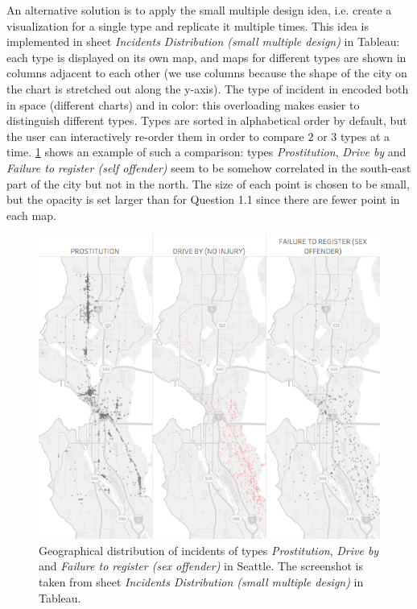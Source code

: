 An alternative solution is to apply the small multiple design idea, i.e. create a visualization for a single type and replicate it multiple times.
This idea is implemented in sheet \textit{Incidents Distribution (small multiple design)} in Tableau:
each type is displayed on its own map, and maps for different types are shown in columns adjacent to each other (we use columns because the shape of the city on the chart is stretched out along the y-axis).
The type of incident in encoded both in space (different charts) and in color:
this overloading makes easier to distinguish different types.
Types are sorted in alphabetical order by default, but the user can interactively re-order them in order to compare $2$ or $3$ types at a time.
\cref{fig:1_2_geographical_distribution_comparison} shows an example of such a comparison:
types \textit{Prostitution}, \textit{Drive by} and \textit{Failure to register (self offender)} seem to be somehow correlated in the south-east part of the city but not in the north.
The size of each point is chosen to be small, but the opacity is set larger than for Question 1.1 since there are fewer point in each map.

\begin{figure}[H]
	\centering
	\includegraphics[width=.75\columnwidth]{figures/1_2_geographical_distribution_comparison}
	\caption{Geographical distribution of incidents of types \textit{Prostitution}, \textit{Drive by} and \textit{Failure to register (sex offender)} in Seattle. The screenshot is taken from sheet \textit{Incidents Distribution (small multiple design)} in Tableau.}
	\label{fig:1_2_geographical_distribution_comparison}
\end{figure}
